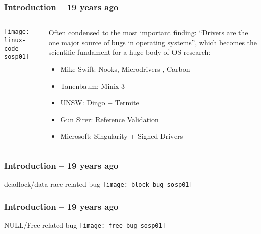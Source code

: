 \begin{frame}[plain]
	\frametitle{Introduction -- 19 years ago}
	
	
	
	\begin{columns}
		
		\begin{column}{.5\textwidth}
			
			\texttt{[image: linux-code-sosp01]}
			
		\end{column}
		
		\begin{column}{.5\textwidth}
			
			Often condensed to the most important finding: “Drivers are
			the one major source of bugs in operating systems”, which
			becomes the scientific fundament for a huge body of OS
			research:
			
			
			\begin{itemize}
				\item Mike Swift: Nooks, Microdrivers ,	Carbon
				\item Tanenbaum: Minix 3
				\item UNSW: Dingo + Termite
				\item Gun Sirer: Reference Validation 
				\item Microsoft: Singularity + Signed Drivers 
				
				
			\end{itemize}
			
		\end{column}
		
		
	\end{columns}
	
	
\end{frame}


\begin{frame}[plain]
	\frametitle{Introduction -- 19 years ago}
	\centering
	deadlock/data race related bug
     \texttt{[image: block-bug-sosp01]}

\end{frame}

\begin{frame}[plain]
	\frametitle{Introduction -- 19 years ago}
	\centering
	NULL/Free related bug
	\texttt{[image: free-bug-sosp01]}
	
\end{frame}



